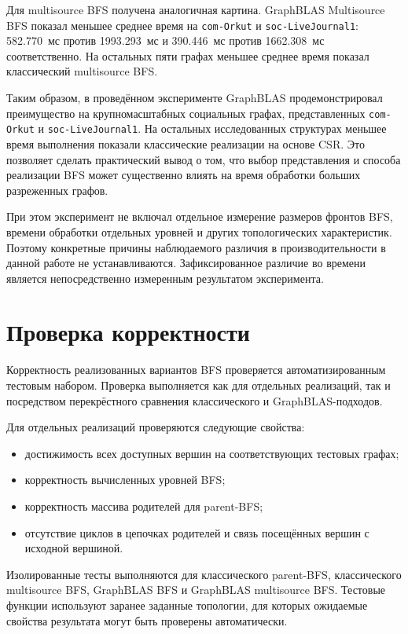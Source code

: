 \documentclass[a4paper,10pt]{article}
\begin{document}
Для multisource BFS получена аналогичная картина. GraphBLAS
Multisource BFS показал меньшее среднее время на
\texttt{com-Orkut} и \texttt{soc-LiveJournal1}: 582.770~мс против
1993.293~мс и 390.446~мс против 1662.308~мс соответственно. На
остальных пяти графах меньшее среднее время показал классический
multisource BFS.

Таким образом, в проведённом эксперименте GraphBLAS продемонстрировал
преимущество на крупномасштабных социальных графах, представленных
\texttt{com-Orkut} и \texttt{soc-LiveJournal1}. На остальных
исследованных структурах меньшее время выполнения показали
классические реализации на основе CSR. Это позволяет сделать
практический вывод о том, что выбор представления и способа
реализации BFS может существенно влиять на время обработки больших
разреженных графов.

При этом эксперимент не включал отдельное измерение размеров фронтов
BFS, времени обработки отдельных уровней и других топологических
характеристик. Поэтому конкретные причины наблюдаемого различия в
производительности в данной работе не устанавливаются. Зафиксированное
различие во времени является непосредственно измеренным результатом
эксперимента.


\section{Проверка корректности}

Корректность реализованных вариантов BFS проверяется
автоматизированным тестовым набором. Проверка выполняется как для
отдельных реализаций, так и посредством перекрёстного сравнения
классического и GraphBLAS-подходов.

Для отдельных реализаций проверяются следующие свойства:
\begin{itemize}
    \item достижимость всех доступных вершин на соответствующих
    тестовых графах;
    \item корректность вычисленных уровней BFS;
    \item корректность массива родителей для parent-BFS;
    \item отсутствие циклов в цепочках родителей и связь посещённых
    вершин с исходной вершиной.
\end{itemize}

Изолированные тесты выполняются для классического parent-BFS,
классического multisource BFS, GraphBLAS BFS и GraphBLAS
multisource BFS. Тестовые функции используют заранее заданные
топологии, для которых ожидаемые свойства результата могут быть
проверены автоматически.
\end{document}
